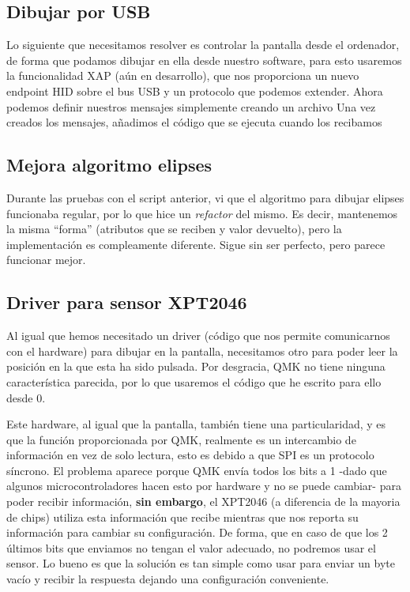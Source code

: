 \subsection{Dibujar por USB} \label{section:dibujar-usb}
Lo siguiente que necesitamos resolver es controlar la pantalla desde el ordenador, de forma que podamos dibujar en ella desde nuestro software, para esto usaremos la funcionalidad XAP\cite{xap} (aún en desarrollo), que nos proporciona un nuevo endpoint HID\cite{hid} sobre el bus USB y un protocolo\cite{xap-specs} que podemos extender. \newline
Ahora podemos definir nuestros mensajes simplemente creando un archivo \cite{xap-custom-msg} \newline
Una vez creados los mensajes, añadimos el código\cite{qp-xap-handler} que se ejecuta cuando los recibamos

\subsection{Mejora algoritmo elipses}
Durante las pruebas con el script anterior, vi que el algoritmo para dibujar elipses funcionaba regular, por lo que hice un \textit{refactor} del mismo. Es decir, mantenemos la misma ``forma'' (atributos que se reciben y valor devuelto), pero la implementación\cite{ellipse-pr} es compleamente diferente. Sigue sin ser perfecto, pero parece funcionar mejor.

\subsection{Driver para sensor XPT2046}
Al igual que hemos necesitado un driver (código que nos permite comunicarnos con el hardware) para dibujar en la pantalla, necesitamos otro para poder leer la posición en la que esta ha sido pulsada. Por desgracia, QMK no tiene ninguna característica parecida, por lo que usaremos el código\cite{touch-driver} que he escrito para ello desde 0. \par
Este hardware, al igual que la pantalla, también tiene una particularidad, y es que la función  proporcionada por QMK, realmente es un intercambio de información en vez de solo lectura, esto es debido a que SPI es un protocolo síncrono. \newline 
El problema aparece porque QMK envía todos los bits a 1 -dado que algunos microcontroladores hacen esto por hardware y no se puede cambiar- para poder recibir información, \textbf{sin embargo}, el XPT2046 (a diferencia de la mayoria de chips) utiliza esta información que recibe mientras que nos reporta su información para cambiar su configuración. De forma, que en caso de que los 2 últimos bits que enviamos no tengan el valor adecuado, no podremos usar el sensor. Lo bueno es que la solución es tan simple como usar  para enviar un byte vacío y recibir la respuesta dejando una configuración conveniente.

